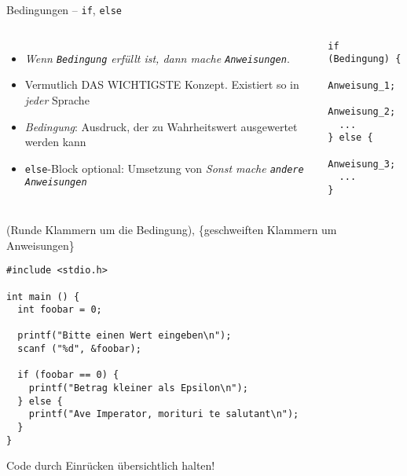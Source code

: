 
\begin{frame}[fragile]{Bedingungen -- \texttt{if}, \texttt{else}}
%
\begin{columns}[T]
\begin{itemize}
\item \emph{Wenn \texttt{Bedingung} erfüllt ist, dann mache \texttt{Anweisungen}}.
\item Vermutlich DAS WICHTIGSTE Konzept. Existiert so in \emph{jeder} Sprache
\item \emph{Bedingung}: Ausdruck, der zu Wahrheitswert ausgewertet werden kann
\item \texttt{else}-Block optional: Umsetzung von \emph{Sonst mache \texttt{andere Anweisungen}}
\end{itemize}
%
\begin{codebox}[Syntax]
\begin{verbatim}
if (Bedingung) {
  Anweisung_1;
  Anweisung_2;
  ...
} else {
  Anweisung_3;
  ...
}
\end{verbatim}
\end{codebox}
\end{columns}
%
\begin{warnbox}
\small (Runde Klammern um die Bedingung), \{geschweiften Klammern um Anweisungen\}
\end{warnbox}
%
\end{frame}


\begin{frame}[fragile]
%
\begin{codebox}
\begin{verbatim}
#include <stdio.h>

int main () {
  int foobar = 0;
  
  printf("Bitte einen Wert eingeben\n");
  scanf ("%d", &foobar);
  
  if (foobar == 0) {
    printf("Betrag kleiner als Epsilon\n");
  } else {
    printf("Ave Imperator, morituri te salutant\n");
  }
}
\end{verbatim}
\end{codebox}
%
\begin{hintbox}
\small Code durch Einrücken übersichtlich halten!
\end{hintbox}
%
\end{frame}


